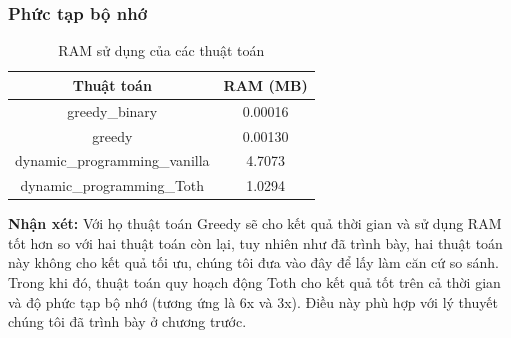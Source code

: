  \subsubsection{Phức tạp bộ nhớ}

 \begin{table}[H]
\centering
    \begin{tabular}{|c|c|}
    \hline
    \textbf{Thuật toán} & \textbf{RAM (MB)}           \\ \hline
    greedy\_binary      & 0.00016        \\ \hline
    greedy             & 0.00130        \\ \hline
    dynamic\_programming\_vanilla             & 4.7073         \\ \hline
    dynamic\_programming\_Toth             & 1.0294         \\ \hline
    \end{tabular}
    \caption{RAM sử dụng của các thuật toán}
\end{table}

\textbf{Nhận xét:} Với họ thuật toán Greedy sẽ cho kết quả thời gian và sử dụng RAM tốt hơn so với hai thuật toán còn lại, tuy nhiên như đã trình bày, hai thuật toán này không cho kết quả tối ưu, chúng tôi đưa vào đây để lấy làm căn cứ so sánh. Trong khi đó, thuật toán quy hoạch động Toth cho kết quả tốt trên cả thời gian và độ phức tạp bộ nhớ (tương ứng là 6x và 3x). Điều này phù hợp với lý thuyết chúng tôi đã trình bày ở chương trước.

